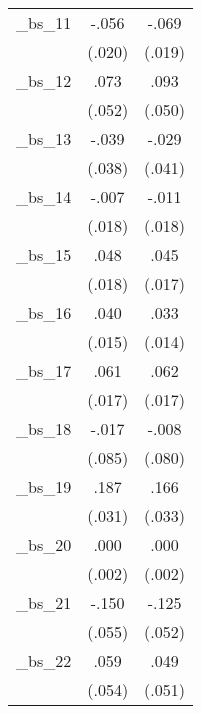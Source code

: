 {\begin{tabular}{l*{2}{c}}
\_bs\_11          &        -.056\sym{***}&        -.069\sym{***}\\
                &       (.020)         &       (.019)         \\
\addlinespace
\_bs\_12          &         .073         &         .093\sym{*}  \\
                &       (.052)         &       (.050)         \\
\addlinespace
\_bs\_13          &        -.039         &        -.029         \\
                &       (.038)         &       (.041)         \\
\addlinespace
\_bs\_14          &        -.007         &        -.011         \\
                &       (.018)         &       (.018)         \\
\addlinespace
\_bs\_15          &         .048\sym{***}&         .045\sym{***}\\
                &       (.018)         &       (.017)         \\
\addlinespace
\_bs\_16          &         .040\sym{***}&         .033\sym{**} \\
                &       (.015)         &       (.014)         \\
\addlinespace
\_bs\_17          &         .061\sym{***}&         .062\sym{***}\\
                &       (.017)         &       (.017)         \\
\addlinespace
\_bs\_18          &        -.017         &        -.008         \\
                &       (.085)         &       (.080)         \\
\addlinespace
\_bs\_19          &         .187\sym{***}&         .166\sym{***}\\
                &       (.031)         &       (.033)         \\
\addlinespace
\_bs\_20          &         .000         &         .000         \\
                &       (.002)         &       (.002)         \\
\addlinespace
\_bs\_21          &        -.150\sym{***}&        -.125\sym{**} \\
                &       (.055)         &       (.052)         \\
\addlinespace
\_bs\_22          &         .059         &         .049         \\
                &       (.054)         &       (.051)         \\

\end{tabular}}
